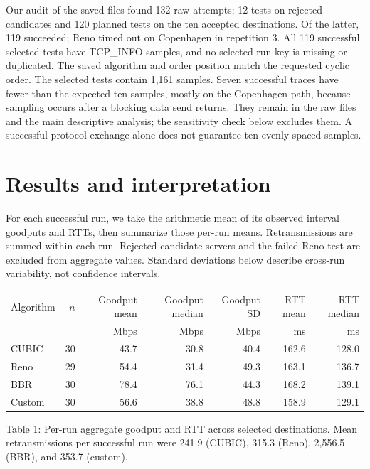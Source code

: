 \documentclass[11pt,letterpaper]{article}
\begin{document}
Our audit of the saved files found 132 raw attempts: 12 tests on rejected
candidates and 120 planned tests on the ten accepted destinations. Of the
latter, 119 succeeded; Reno timed out on Copenhagen in repetition 3. All 119
successful selected tests have TCP\_INFO samples, and no selected run key is
missing or duplicated. The saved algorithm and order position match the
requested cyclic order. The selected tests contain 1,161 samples. Seven
successful traces have fewer than the expected ten samples, mostly on the
Copenhagen path, because sampling occurs after a blocking data send returns.
They remain in the raw files and the main descriptive analysis; the sensitivity
check below excludes them. A successful protocol exchange alone does not
guarantee ten evenly spaced samples.

\section{Results and interpretation}
For each successful run, we take the arithmetic mean of its observed interval
goodputs and RTTs, then summarize those per-run means. Retransmissions are
summed within each run. Rejected candidate servers and the failed Reno test
are excluded from aggregate values. Standard deviations below describe
cross-run variability, not confidence intervals.

\begin{center}
\small
\begin{tabular}{lrrrrrr}
\toprule
Algorithm & $n$ & Goodput mean & Goodput median & Goodput SD & RTT mean & RTT median \\
 & & Mbps & Mbps & Mbps & ms & ms \\
\midrule
CUBIC & 30 & 43.7 & 30.8 & 40.4 & 162.6 & 128.0 \\
Reno & 29 & 54.4 & 31.4 & 49.3 & 163.1 & 136.7 \\
BBR & 30 & 78.4 & 76.1 & 44.3 & 168.2 & 139.1 \\
Custom & 30 & 56.6 & 38.8 & 48.8 & 158.9 & 129.1 \\
\bottomrule
\end{tabular}
\end{center}
\vspace{-0.4em}
\begin{center}\small Table 1: Per-run aggregate goodput and RTT across selected destinations.
Mean retransmissions per successful run were 241.9 (CUBIC), 315.3 (Reno),
2,556.5 (BBR), and 353.7 (custom).\end{center}
\end{document}

